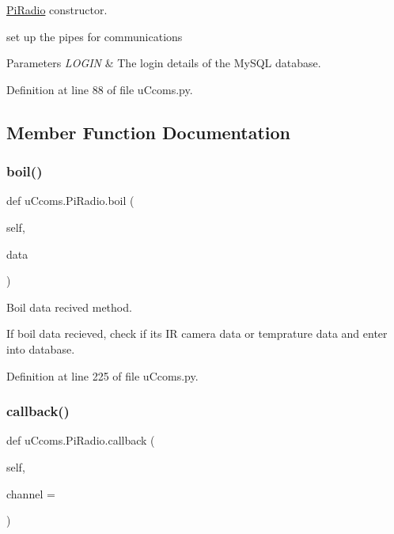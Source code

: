 \mbox{\hyperlink{classu_ccoms_1_1_pi_radio}{Pi\+Radio}} constructor. 

set up the pipes for communications 
\begin{DoxyParams}{Parameters}
{\em L\+O\+G\+IN} & The login details of the My\+S\+QL database. \\
\hline
\end{DoxyParams}


Definition at line 88 of file u\+Ccoms.\+py.



\subsection{Member Function Documentation}
\mbox{\label{classu_ccoms_1_1_pi_radio_a1005053135e020acd9a954190f0b34ec}} 
\subsubsection{\texorpdfstring{boil()}{boil()}}
{\footnotesize\ttfamily def u\+Ccoms.\+Pi\+Radio.\+boil (\begin{DoxyParamCaption}\item[{}]{self,  }\item[{}]{data }\end{DoxyParamCaption})}



Boil data recived method. 

If boil data recieved, check if its IR camera data or temprature data and enter into database. 

Definition at line 225 of file u\+Ccoms.\+py.

\mbox{\label{classu_ccoms_1_1_pi_radio_a6a6fa8055cf1688958aa352a455f5f9a}} 
\subsubsection{\texorpdfstring{callback()}{callback()}}
{\footnotesize\ttfamily def u\+Ccoms.\+Pi\+Radio.\+callback (\begin{DoxyParamCaption}\item[{}]{self,  }\item[{}]{channel = {} }\end{DoxyParamCaption})}



